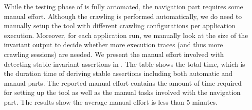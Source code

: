 
 While the testing phase of \jsart is fully automated, the navigation part requires some manual effort. Although the crawling is performed automatically, we do need to manually setup the tool with different crawling configurations per application execution.  Moreover, for each application run, we manually look at the size of the invariant output to decide whether more execution traces (and thus more crawling sessions) are needed.
%
We present the manual effort involved with detecting stable invariant assertions in . 
The table shows the total time, which is the duration time of deriving stable assertions including both automatic and manual parts. 
The reported manual effort contains the amount of time required 
for setting up the tool as well as the manual tasks involved with the navigation part.
The results show the average manual effort is less than 5 minutes.




